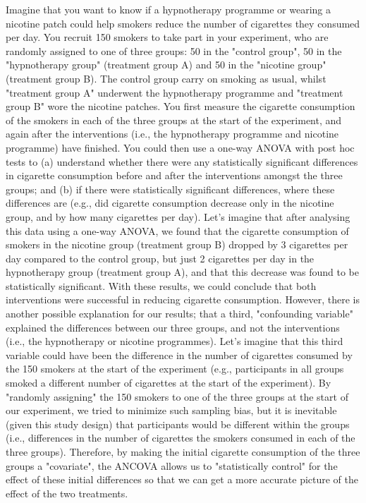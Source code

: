 Imagine that you want to know if a hypnotherapy programme or wearing a nicotine patch could help smokers reduce the number of cigarettes they consumed per day. You recruit 150 smokers to take part in your experiment, who are randomly assigned to one of three groups: 50 in the "control group", 50 in the "hypnotherapy group" (treatment group A) and 50 in the "nicotine group" (treatment group B). The control group carry on smoking as usual, whilst "treatment group A" underwent the hypnotherapy programme and "treatment group B" wore the nicotine patches. You first measure the cigarette consumption of the smokers in each of the three groups at the start of the experiment, and again after the interventions (i.e., the hypnotherapy programme and nicotine programme) have finished. You could then use a one-way ANOVA with post hoc tests to (a) understand whether there were any statistically significant differences in cigarette consumption before and after the interventions amongst the three groups; and (b) if there were statistically significant differences, where these differences are (e.g., did cigarette consumption decrease only in the nicotine group, and by how many cigarettes per day). Let's imagine that after analysing this data using a one-way ANOVA, we found that the cigarette consumption of smokers in the nicotine group (treatment group B) dropped by 3 cigarettes per day compared to the control group, but just 2 cigarettes per day in the hypnotherapy group (treatment group A), and that this decrease was found to be statistically significant. With these results, we could conclude that both interventions were successful in reducing cigarette consumption. However, there is another possible explanation for our results; that a third, "confounding variable" explained the differences between our three groups, and not the interventions (i.e., the hypnotherapy or nicotine programmes). Let's imagine that this third variable could have been the difference in the number of cigarettes consumed by the 150 smokers at the start of the experiment (e.g., participants in all groups smoked a different number of cigarettes at the start of the experiment). By "randomly assigning" the 150 smokers to one of the three groups at the start of our experiment, we tried to minimize such sampling bias, but it is inevitable (given this study design) that participants would be different within the groups (i.e., differences in the number of cigarettes the smokers consumed in each of the three groups). Therefore, by making the initial cigarette consumption of the three groups a "covariate", the ANCOVA allows us to "statistically control" for the effect of these initial differences so that we can get a more accurate picture of the effect of the two treatments.

